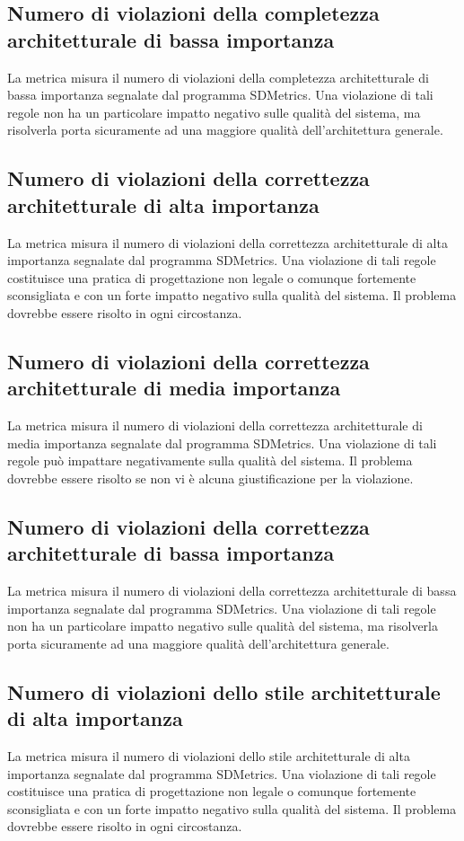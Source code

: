 \subsection{Numero di violazioni della completezza architetturale di bassa importanza}
La metrica misura il numero di violazioni della completezza architetturale di bassa importanza segnalate dal programma SDMetrics. Una violazione di tali regole non ha un particolare impatto negativo sulle qualità del sistema, ma risolverla porta sicuramente ad una maggiore qualità dell'architettura generale.

\subsection{Numero di violazioni della correttezza architetturale di alta importanza}
La metrica misura il numero di violazioni della correttezza architetturale di alta importanza segnalate dal programma SDMetrics. Una violazione di tali regole costituisce una pratica di progettazione non legale o comunque fortemente sconsigliata e con un forte impatto negativo sulla qualità del sistema. Il problema dovrebbe essere risolto in ogni circostanza.

\subsection{Numero di violazioni della correttezza architetturale di media importanza}
La metrica misura il numero di violazioni della correttezza architetturale di media importanza segnalate dal programma SDMetrics. Una violazione di tali regole può impattare negativamente sulla qualità del sistema. Il problema dovrebbe essere risolto se non vi è alcuna giustificazione per la violazione.

\subsection{Numero di violazioni della correttezza architetturale di bassa importanza}
La metrica misura il numero di violazioni della correttezza architetturale di bassa importanza segnalate dal programma SDMetrics. Una violazione di tali regole non ha un particolare impatto negativo sulle qualità del sistema, ma risolverla porta sicuramente ad una maggiore qualità dell'architettura generale.

\subsection{Numero di violazioni dello stile architetturale di alta importanza}
La metrica misura il numero di violazioni dello stile architetturale di alta importanza segnalate dal programma SDMetrics. Una violazione di tali regole costituisce una pratica di progettazione non legale o comunque fortemente sconsigliata e con un forte impatto negativo sulla qualità del sistema. Il problema dovrebbe essere risolto in ogni circostanza.

